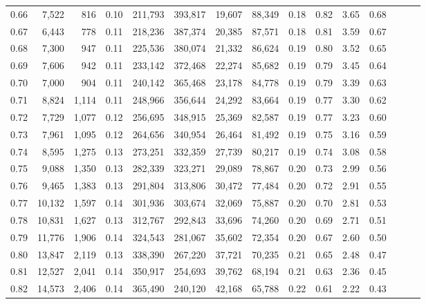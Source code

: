 \begin{tabular}{rrrrrrrrrrrrrrr}
0.66 &   7,522 &    816 &  0.10 &  211,793 &  393,817 &   19,607 &   88,349 &  0.18 &  0.82 &  3.65 &      0.68 \\
0.67 &   6,443 &    778 &  0.11 &  218,236 &  387,374 &   20,385 &   87,571 &  0.18 &  0.81 &  3.59 &      0.67 \\
0.68 &   7,300 &    947 &  0.11 &  225,536 &  380,074 &   21,332 &   86,624 &  0.19 &  0.80 &  3.52 &      0.65 \\
0.69 &   7,606 &    942 &  0.11 &  233,142 &  372,468 &   22,274 &   85,682 &  0.19 &  0.79 &  3.45 &      0.64 \\
0.70 &   7,000 &    904 &  0.11 &  240,142 &  365,468 &   23,178 &   84,778 &  0.19 &  0.79 &  3.39 &      0.63 \\
0.71 &   8,824 &  1,114 &  0.11 &  248,966 &  356,644 &   24,292 &   83,664 &  0.19 &  0.77 &  3.30 &      0.62 \\
0.72 &   7,729 &  1,077 &  0.12 &  256,695 &  348,915 &   25,369 &   82,587 &  0.19 &  0.77 &  3.23 &      0.60 \\
0.73 &   7,961 &  1,095 &  0.12 &  264,656 &  340,954 &   26,464 &   81,492 &  0.19 &  0.75 &  3.16 &      0.59 \\
0.74 &   8,595 &  1,275 &  0.13 &  273,251 &  332,359 &   27,739 &   80,217 &  0.19 &  0.74 &  3.08 &      0.58 \\
0.75 &   9,088 &  1,350 &  0.13 &  282,339 &  323,271 &   29,089 &   78,867 &  0.20 &  0.73 &  2.99 &      0.56 \\
0.76 &   9,465 &  1,383 &  0.13 &  291,804 &  313,806 &   30,472 &   77,484 &  0.20 &  0.72 &  2.91 &      0.55 \\
0.77 &  10,132 &  1,597 &  0.14 &  301,936 &  303,674 &   32,069 &   75,887 &  0.20 &  0.70 &  2.81 &      0.53 \\
0.78 &  10,831 &  1,627 &  0.13 &  312,767 &  292,843 &   33,696 &   74,260 &  0.20 &  0.69 &  2.71 &      0.51 \\
0.79 &  11,776 &  1,906 &  0.14 &  324,543 &  281,067 &   35,602 &   72,354 &  0.20 &  0.67 &  2.60 &      0.50 \\
0.80 &  13,847 &  2,119 &  0.13 &  338,390 &  267,220 &   37,721 &   70,235 &  0.21 &  0.65 &  2.48 &      0.47 \\
0.81 &  12,527 &  2,041 &  0.14 &  350,917 &  254,693 &   39,762 &   68,194 &  0.21 &  0.63 &  2.36 &      0.45 \\
0.82 &  14,573 &  2,406 &  0.14 &  365,490 &  240,120 &   42,168 &   65,788 &  0.22 &  0.61 &  2.22 &      0.43 \\

\end{tabular}
